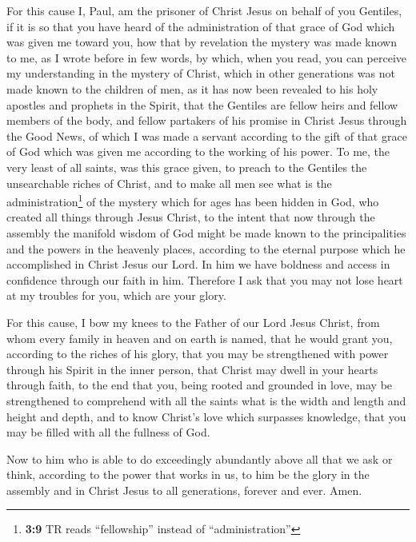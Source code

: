  For this cause I, Paul, am the prisoner of Christ Jesus
on behalf of you Gentiles,  if it is so that you have
heard of the administration of that grace of God which was given me
toward you,  how that by revelation the mystery was made
known to me, as I wrote before in few words,  by which,
when you read, you can perceive my understanding in the mystery of
Christ,  which in other generations was not made known to
the children of men, as it has now been revealed to his holy apostles
and prophets in the Spirit,  that the Gentiles are fellow
heirs and fellow members of the body, and fellow partakers of his
promise in Christ Jesus through the Good News,  of which I
was made a servant according to the gift of that grace of God which was
given me according to the working of his power.  To me,
the very least of all saints, was this grace given, to preach to the
Gentiles the unsearchable riches of Christ,  and to make
all men see what is the administration\footnote{\textbf{3:9} TR reads
  ``fellowship'' instead of ``administration''} of the mystery which for
ages has been hidden in God, who created all things through Jesus
Christ,  to the intent that now through the assembly the
manifold wisdom of God might be made known to the principalities and the
powers in the heavenly places,  according to the eternal
purpose which he accomplished in Christ Jesus our Lord. 
In him we have boldness and access in confidence through our faith in
him.  Therefore I ask that you may not lose heart at my
troubles for you, which are your glory.

 For this cause, I bow my knees to the Father of our Lord
Jesus Christ,  from whom every family in heaven and on
earth is named,  that he would grant you, according to
the riches of his glory, that you may be strengthened with power through
his Spirit in the inner person,  that Christ may dwell in
your hearts through faith, to the end that you, being rooted and
grounded in love,  may be strengthened to comprehend with
all the saints what is the width and length and height and depth,
 and to know Christ's love which surpasses knowledge,
that you may be filled with all the fullness of God.

 Now to him who is able to do exceedingly abundantly
above all that we ask or think, according to the power that works in us,
 to him be the glory in the assembly and in Christ Jesus
to all generations, forever and ever. Amen.


